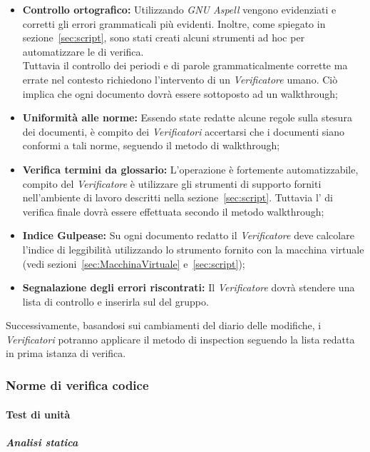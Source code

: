 \documentclass{scalatekids-article}
\begin{document}
\begin{itemize}
\item\textbf{Controllo ortografico:} Utilizzando \textit{GNU Aspell} vengono evidenziati e corretti
  gli errori grammaticali più evidenti. Inoltre, come spiegato in sezione~\ref{sec:script}, sono stati
  creati alcuni strumenti ad hoc per automatizzare le  di verifica.\\
  Tuttavia il controllo dei periodi e di parole grammaticalmente corrette ma errate nel contesto richiedono
  l'intervento di un \textit{Verificatore} umano. Ciò implica che ogni documento dovrà essere sottoposto ad un walkthrough;
\item\textbf{Uniformità alle norme:} Essendo state redatte alcune regole sulla stesura dei documenti, è compito dei \textit{Verificatori}
  accertarsi che i documenti siano conformi a tali norme, seguendo il metodo di walkthrough;
\item\textbf{Verifica termini da glossario:} L'operazione è fortemente automatizzabile, compito del \textit{Verificatore} è utilizzare gli strumenti di supporto
  forniti nell'ambiente di lavoro descritti nella sezione~\ref{sec:script}. Tuttavia l' di verifica finale dovrà essere effettuata secondo il metodo
  walkthrough;
\item\textbf{Indice Gulpease:} Su ogni documento redatto il \textit{Verificatore} deve calcolare l'indice di leggibilità utilizzando lo strumento fornito
  con la macchina virtuale (vedi sezioni~\ref{sec:MacchinaVirtuale} e~\ref{sec:script});
\item\textbf{Segnalazione degli errori riscontrati:} Il \textit{Verificatore} dovrà stendere una lista di controllo e inserirla sul  del gruppo.
\end{itemize}
Successivamente, basandosi sui cambiamenti del diario delle modifiche, i
\textit{Verificatori} potranno applicare il metodo di inspection seguendo la
lista redatta in prima istanza di verifica.

\subsubsection{Norme di verifica codice}
\label{sec:NormeDiVerifica}

\paragraph{Test di unità}

\subparagraph{Analisi statica}
\label{sec:AnalisiStatica}
\end{document}
